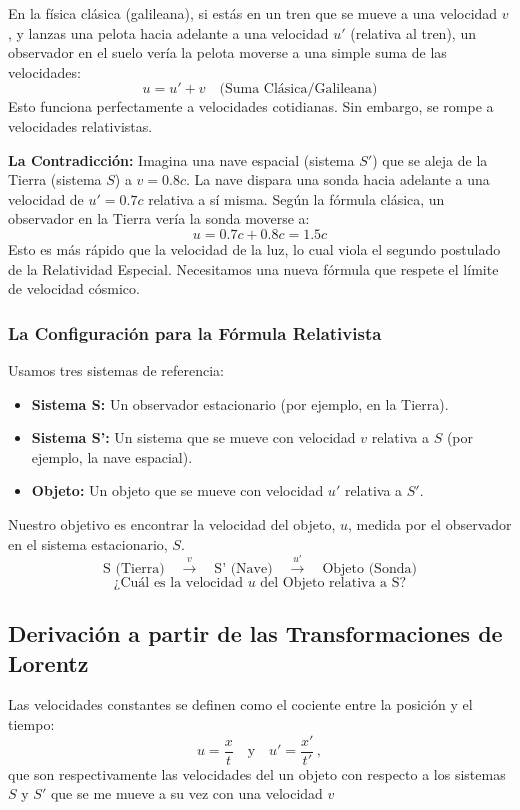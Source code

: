 \documentclass[11pt,a4paper]{book}
\begin{document}
En la física clásica (galileana), si estás en un tren que se mueve a una velocidad $v$, y lanzas una pelota hacia adelante a una velocidad $u'$ (relativa al tren), un observador en el suelo vería la pelota moverse a una simple suma de las velocidades:
\[ u = u' + v \quad \text{(Suma Clásica/Galileana)} \]
Esto funciona perfectamente a velocidades cotidianas. Sin embargo, se rompe a velocidades relativistas.

\textbf{La Contradicción:} Imagina una nave espacial (sistema $S'$) que se aleja de la Tierra (sistema $S$) a $v=0.8c$. La nave dispara una sonda hacia adelante a una velocidad de $u'=0.7c$ relativa a sí misma. Según la fórmula clásica, un observador en la Tierra vería la sonda moverse a:
\[ u = 0.7c + 0.8c = 1.5c \]
Esto es más rápido que la velocidad de la luz, lo cual viola el segundo postulado de la Relatividad Especial. Necesitamos una nueva fórmula que respete el límite de velocidad cósmico.

\subsubsection*{La Configuración para la Fórmula Relativista}

Usamos tres sistemas de referencia:
\begin{itemize}
    \item \textbf{Sistema S:} Un observador estacionario (por ejemplo, en la Tierra).
    \item \textbf{Sistema S':} Un sistema que se mueve con velocidad $v$ relativa a $S$ (por ejemplo, la nave espacial).
    \item \textbf{Objeto:} Un objeto que se mueve con velocidad $u'$ relativa a $S'$.
\end{itemize}
Nuestro objetivo es encontrar la velocidad del objeto, \textbf{$u$}, medida por el observador en el sistema estacionario, $S$.
\[
\text{S (Tierra)} \quad \xrightarrow{v} \quad \text{S' (Nave)} \quad \xrightarrow{u'} \quad \text{Objeto (Sonda)}
\]
\[
\text{¿Cuál es la velocidad } u \text{ del Objeto relativa a S?}
\]

\subsection{Derivación a partir de las Transformaciones de Lorentz}

Las velocidades constantes se definen como el cociente entre la posición y el tiempo:
\[ u = \frac{x}{t} \quad \text{y} \quad u' = \frac{x'}{t'}\,, \]
que son respectivamente las velocidades del un objeto con respecto a los sistemas $S$ y $S'$ que se me mueve a su vez con una velocidad $v$
\end{document}
